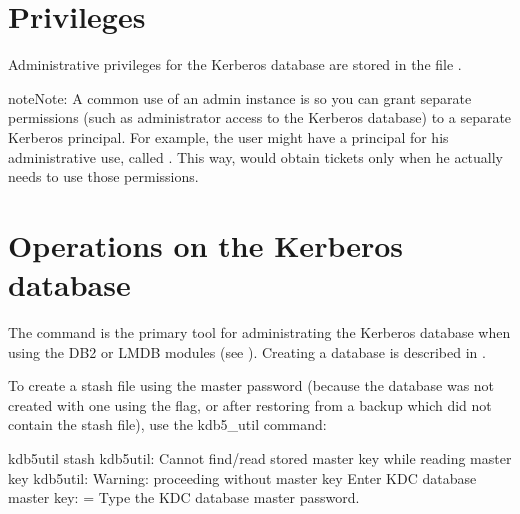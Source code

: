 \documentclass[letterpaper,10pt,english]{sphinxmanual}
\begin{document}
\section{Privileges}
\label{\detokenize{admin/database:privileges}}\label{\detokenize{admin/database:id3}}
\sphinxAtStartPar
Administrative privileges for the Kerberos database are stored in the
file {\hyperref[\detokenize{admin/conf_files/kadm5_acl:kadm5-acl-5}]{}}.

\begin{sphinxadmonition}{note}{Note:}
\sphinxAtStartPar
A common use of an admin instance is so you can grant
separate permissions (such as administrator access to the
Kerberos database) to a separate Kerberos principal. For
example, the user  might have a principal for
his administrative use, called .  This
way,  would obtain  tickets
only when he actually needs to use those permissions.
\end{sphinxadmonition}


\section{Operations on the Kerberos database}
\label{\detokenize{admin/database:operations-on-the-kerberos-database}}\label{\detokenize{admin/database:db-operations}}
\sphinxAtStartPar
The {\hyperref[\detokenize{admin/admin_commands/kdb5_util:kdb5-util-8}]{}} command is the primary tool for administrating
the Kerberos database when using the DB2 or LMDB modules (see
{\hyperref[\detokenize{admin/dbtypes:dbtypes}]{}}).  Creating a database is described in
{\hyperref[\detokenize{admin/install_kdc:create-db}]{}}.

\sphinxAtStartPar
To create a stash file using the master password (because the database
was not created with one using the  flag, or after
restoring from a backup which did not contain the stash file), use the
kdb5\_util  command:

\begin{sphinxVerbatim}[commandchars=\\\{\}]
\PYGZdl{} kdb5\PYGZus{}util stash
kdb5\PYGZus{}util: Cannot find/read stored master key while reading master key
kdb5\PYGZus{}util: Warning: proceeding without master key
Enter KDC database master key:  \PYGZlt{}= Type the KDC database master password.
\end{sphinxVerbatim}
\end{document}
